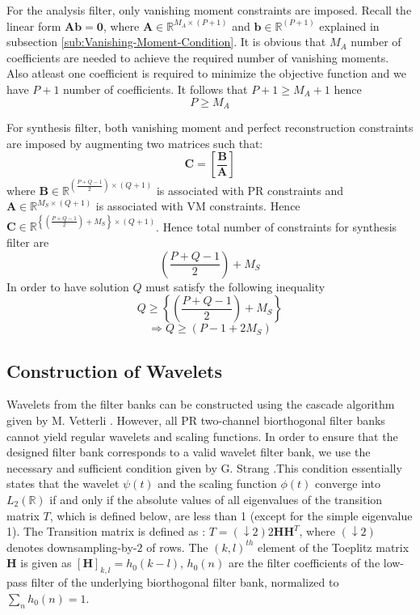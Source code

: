For the analysis filter, only vanishing moment constraints are imposed. Recall the linear form $\mathbf{Ab=0}$, where $\mathbf{A}\in\mathbb{R}^{M_{A}\times(P+1)}$ and $ \mathbf{b}\in\mathbb{R}^{(P+1)}$ explained in subsection \ref{sub:Vanishing-Moment-Condition}. It is obvious that $M_A$ number of coefficients are needed to achieve the required number of vanishing moments. Also atleast one coefficient is required to minimize the objective function and we have $P+1$ number of coefficients. It follows that $P+1 \geq M_A + 1$  hence $$P \geq M_A$$

 For synthesis filter, both vanishing moment and perfect reconstruction constraints are imposed by augmenting two matrices such that: \[\mathbf{C}=\left[\mathbf{\frac{B}{A}}\right]\] where $\mathbf{B} \in {\mathbb{R}}^{\left(\frac{P+Q-1}{2}\right)\times(Q+1)}$ is associated with PR constraints and $\mathbf{A}\in\mathbb{R}^{{M_{S}}\times(Q+1)}$ is associated with VM constraints. Hence $\mathbf{C}\in\mathbb{R}^{\left\{\left(\frac{P+Q-1}{2}\right)+M_{S}\right\}\times(Q+1)}$. Hence total number of constraints for synthesis filter are $$\left(\frac{P+Q-1}{2}\right)+M_{S}$$ In order to have solution $Q$ must satisfy the following inequality $$ Q \geq \left\{\left(\frac{P+Q-1}{2}\right)+M_{S}\right\} $$ $$ \Rightarrow Q \geq(P-1+2M_S)$$

\subsection{\label{Construction of Wavelets}Construction of Wavelets}
Wavelets from the filter banks can be constructed using the cascade algorithm given by M. Vetterli \cite{key-12}. However, all PR two-channel biorthogonal filter banks cannot yield
regular wavelets and scaling functions. In order to ensure that the designed filter bank corresponds to a valid wavelet filter bank, we use the necessary and sufficient condition given by G. Strang \cite{key-45}.This condition essentially states that the wavelet $\psi(t)$ and the scaling function $\phi(t)$ converge into $L_{2}(\mathbb{R})$ if and only if the absolute values of all eigenvalues of the transition matrix $T$, which is defined below, are less than 1 (except for the simple eigenvalue 1). The Transition matrix is defined as : $T=\left(\downarrow2\right)2\mathbf{HH}^{T}$, where $\left(\downarrow2\right)$ denotes downsampling-by-$2$ of rows. The $(k,l)^{th}$ element of the Toeplitz matrix $\mathbf{H}$ is given as $[\mathbf{H}]_{k,l}=h_{0}(k-l)$, $h_{0}(n)$ are the filter coefficients
of the low-pass filter of the underlying biorthogonal filter bank, normalized to $\sum_{n}h_{0}(n)=1$.

